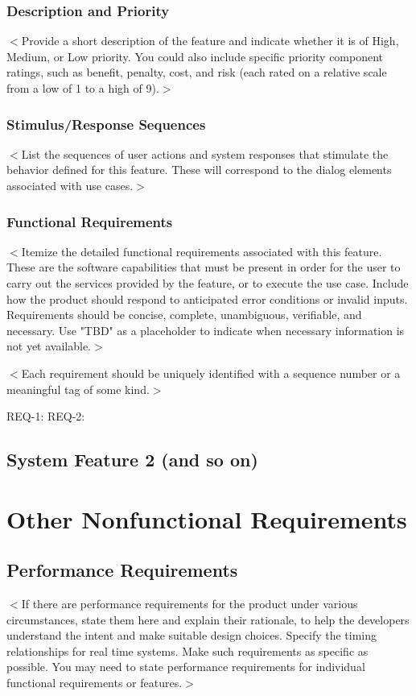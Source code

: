 \documentclass[a4paper, 11pt]{scrreprt}
\begin{document}
\begin{description}
\subsection{Description and Priority}
$<$Provide a short description of the feature and indicate whether it is of 
High, Medium, or Low priority. You could also include specific priority 
component ratings, such as benefit, penalty, cost, and risk (each rated on a 
relative scale from a low of 1 to a high of 9).$>$

\subsection{Stimulus/Response Sequences}
$<$List the sequences of user actions and system responses that stimulate the 
behavior defined for this feature. These will correspond to the dialog elements 
associated with use cases.$>$

\subsection{Functional Requirements}
$<$Itemize the detailed functional requirements associated with this feature.  
These are the software capabilities that must be present in order for the user 
to carry out the services provided by the feature, or to execute the use case.  
Include how the product should respond to anticipated error conditions or 
invalid inputs. Requirements should be concise, complete, unambiguous, 
verifiable, and necessary. Use "TBD" as a placeholder to indicate when necessary 
information is not yet available.$>$

$<$Each requirement should be uniquely identified with a sequence number or a 
meaningful tag of some kind.$>$

REQ-1:	REQ-2:

\section{System Feature 2 (and so on)}


\chapter{Other Nonfunctional Requirements}

\section{Performance Requirements}
$<$If there are performance requirements for the product under various 
circumstances, state them here and explain their rationale, to help the 
developers understand the intent and make suitable design choices. Specify the 
timing relationships for real time systems. Make such requirements as specific 
as possible. You may need to state performance requirements for individual 
functional requirements or features.$>$


\end{description}
\end{document}
